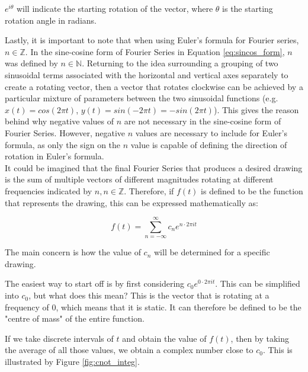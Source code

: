 \documentclass[letterpaper, 12pt]{article}
\begin{document}
\(e^{i\theta}\) will indicate the starting rotation of the vector,
where \(\theta\) is the starting rotation angle in radians.

Lastly, it is important to note that when using Euler's formula for
Fourier series, \(n \in \mathbb{Z}\).
In the sine-cosine form of Fourier Series in Equation \ref*{eq:sincos_form},
\(n\) was defined by \(n \in \mathbb{N}\).
Returning to the idea surrounding a grouping of two sinusoidal terms
associated with the horizontal and vertical axes separately to create
a rotating vector,
then a vector that rotates clockwise can be achieved
by a particular mixture of parameters between the two
sinusoidal functions (e.g. \(x(t) = cos(2\pi t)\), \(y(t) = sin(-2\pi t) = -sin(2\pi t)\)).
This gives the reason behind why negative values of \(n\) are not
necessary in the sine-cosine form of Fourier Series. However,
negative \(n\) values are necessary to include for Euler's formula,
as only the sign on the \(n\) value is capable of defining the direction
of rotation in Euler's formula.
\\

It could be imagined that the final Fourier Series that produces a desired drawing
is the sum of multiple vectors of different magnitudes rotating at different frequencies
indicated by \(n, n \in \mathbb{Z}\). Therefore, if \(f(t)\) is defined to be the
function that represents the drawing, this can be expressed mathematically
as:

\begin{equation}
    f(t) = \sum_{n=-\infty}^{\infty} c_n e^{n \cdot 2\pi it}
    \label{eq:ft_def}
\end{equation}

The main concern is how the value of \(c_n\) will be determined
for a specific drawing.

The easiest way to start off is by first considering \(c_0 e^{0 \cdot 2\pi it}\).
This can be simplified into \(c_0\), but what does this mean?
This is the vector that is rotating at a frequency of 0, which means that
it is static. It can therefore be defined to be the "centre of mass"\cite{sandersonWhatFourierSeries2019}
of the entire function.

If we take discrete intervals of \(t\) and obtain the value of \(f(t)\),
then by taking the average of all those values, we obtain a complex number
close to \(c_0\). This is illustrated by Figure \ref{fig:cnot_integ}.
\end{document}
